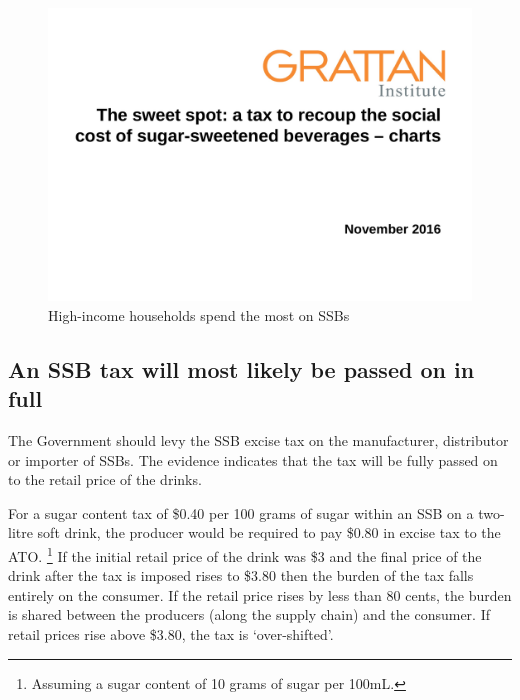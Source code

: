 \documentclass[embargoed]{grattan}
\begin{document}
\begin{figure}
\caption{High-income households spend the most on SSBs}

\includegraphics[page=11]{atlas/ObesityCharts}


\end{figure}

\subsection{An SSB tax will most likely be passed on in full}\label{an-ssb-tax-will-most-likely-be-passed-on-in-full}

The Government should levy the SSB excise tax on the manufacturer, distributor or importer of SSBs.
The evidence indicates that the tax will be fully passed on to the retail price of the drinks.

For a sugar content tax of \$0.40 per 100 grams of sugar within an SSB on a two-litre soft drink, the producer would be required to pay \$0.80 in excise tax to the ATO.%
\footnote{Assuming a sugar content of 10 grams of sugar per 100mL.} If the initial retail price of the drink was \$3 and the final price of the drink after the tax is imposed rises to \$3.80 then the burden of the tax falls entirely on the consumer.
If the retail price rises by less than 80 cents, the burden is shared between the producers (along the supply chain) and the consumer.
If retail prices rise above \$3.80, the tax is `over-shifted'.
\end{document}
